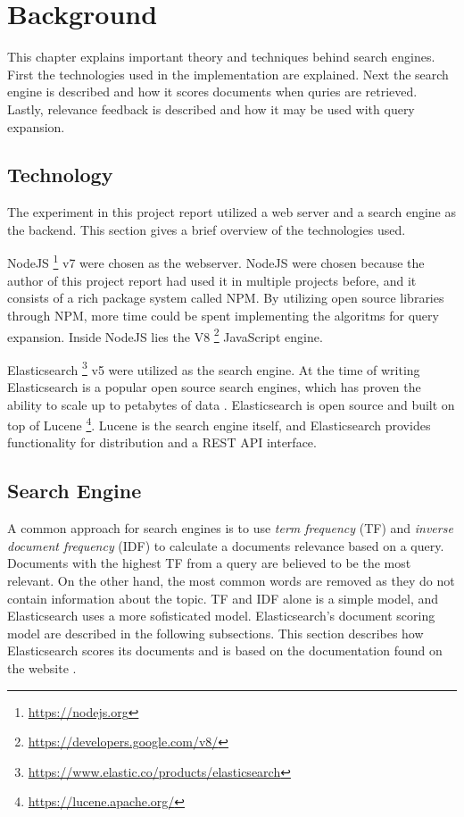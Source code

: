 \chapter{Background}
\label{ch:background}
This chapter explains important theory and techniques behind search engines.
First the technologies used in the implementation are explained.
Next the search engine is described and how it scores documents when quries are retrieved.
Lastly, relevance feedback is described and how it may be used with query expansion.

\section{Technology}
The experiment in this project report utilized a web server and a search engine as the backend.
This section gives a brief overview of the technologies used.

NodeJS \footnote{\url{https://nodejs.org}} v7 were chosen as the webserver.
NodeJS were chosen because the author of this project report had used it in multiple projects before,
and it consists of a rich package system called NPM.
By utilizing open source libraries through NPM, more time could be spent implementing the algoritms for query expansion.
Inside NodeJS lies the V8 \footnote{\url{https://developers.google.com/v8/}} JavaScript engine.

Elasticsearch \footnote{\url{https://www.elastic.co/products/elasticsearch}} v5 were utilized as the search engine.
At the time of writing Elasticsearch is a popular open source search engines, which has proven the ability to scale up to petabytes of data \cite{elasticsearch-scale}.
Elasticsearch is open source and built on top of Lucene \footnote{\url{https://lucene.apache.org/}}.
Lucene is the search engine itself,
and Elasticsearch provides functionality for distribution and a REST API interface.

\section{Search Engine}
A common approach for search engines is to use \textit{term frequency} (TF) and \textit{inverse document frequency} (IDF) to calculate a documents relevance based on a query.
Documents with the highest TF from a query are believed to be the most relevant.
On the other hand, the most common words are removed as they do not contain information about the topic.
TF and IDF alone is a simple model, and Elasticsearch uses a more sofisticated model.
Elasticsearch's document scoring model are described in the following subsections.
This section describes how Elasticsearch scores its documents and is based on the documentation found on the website \cite{elasticsearch-scoring}.

